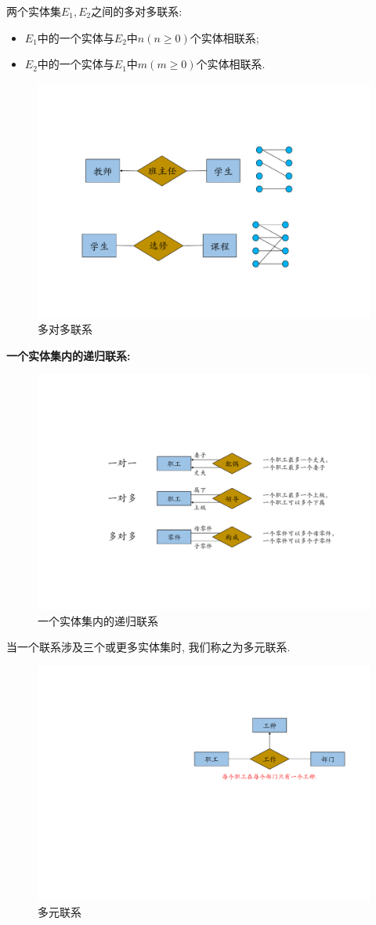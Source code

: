 \begin{definition}[多对多联系]
    两个实体集$E_1,E_2$之间的多对多联系:
    \begin{itemize}
        \item $E_1$中的一个实体与$E_2$中$n(n\geq 0)$个实体相联系;
        \item $E_2$中的一个实体与$E_1$中$m(m\geq 0)$个实体相联系.
    \end{itemize}
\end{definition}

\begin{figure}[H]
    \centering
    \includegraphics[width=.6\textwidth]{figure/多对多.pdf}
    \caption{多对多联系}
\end{figure}

\textbf{一个实体集内的递归联系:}

\begin{figure}[H]
    \centering
    \includegraphics[width=.7\textwidth]{figure/递归联系.pdf}
    \caption{一个实体集内的递归联系}
    \label{n-ary-link}
\end{figure}

\begin{definition}[多元联系]
    当一个联系涉及三个或更多实体集时, 我们称之为多元联系.
\end{definition}

\begin{figure}[H]
    \centering
    \includegraphics[width=.5\textwidth]{figure/多元联系.pdf}
    \caption{多元联系}
\end{figure}

